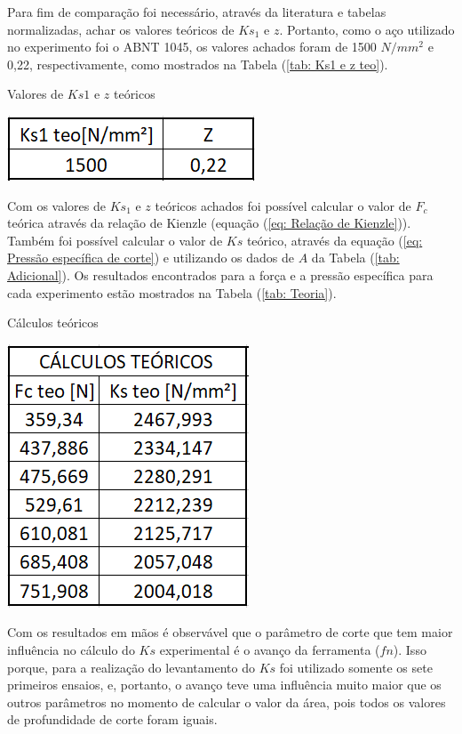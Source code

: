 \documentclass[deposito, acronym, symbols]{fei}
\begin{document}
Para fim de comparação foi necessário, através da literatura e tabelas normalizadas, achar os valores teóricos de $Ks_1$ e $z$. Portanto, como o aço utilizado no experimento foi o ABNT 1045, os valores achados foram de 1500 $N/mm^2$ e 0,22, respectivamente, como mostrados na Tabela (\ref{tab: Ks1 e z teo}). 
 
\begin{table}[!htb]
 \centering
    \caption{Valores de $Ks1$ e $z$ teóricos}
    \includegraphics[width=0.3\linewidth]{Imagens/Ks1 e z tabelado.png}
    \label{tab: Ks1 e z teo}
 \end{table}

Com os valores de $Ks_1$ e $z$ teóricos achados foi possível calcular o valor de $F_c$ teórica através da relação de Kienzle (equação (\ref{eq: Relação de Kienzle})). Também foi possível calcular o valor de $Ks$ teórico, através da equação (\ref{eq: Pressão específica de corte}) e utilizando os dados de $A$ da Tabela (\ref{tab: Adicional}). Os resultados encontrados para a força e a pressão específica para cada experimento estão mostrados na Tabela (\ref{tab: Teoria}).


\begin{table}[!htb]
 \centering
    \caption{Cálculos teóricos}
    \includegraphics[width=0.3\linewidth]{Imagens/Calculos teoricos.png}
    \label{tab: Teoria}
 \end{table}

Com os resultados em mãos é observável que o parâmetro de corte que tem maior influência no cálculo do $Ks$ experimental é o avanço da ferramenta ($fn$). Isso porque, para a realização do levantamento do $Ks$ foi utilizado somente os sete primeiros ensaios, e, portanto, o avanço teve uma influência muito maior que os outros parâmetros no momento de calcular o valor da área, pois todos os valores de profundidade de corte foram iguais.
\end{document}
